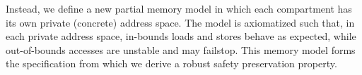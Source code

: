 \documentclass{article}
\begin{document}
Instead, we define a new partial memory model in which each compartment has its own private
(concrete) address space. The model is axiomatized such that, in each private address space,
in-bounds loads and stores behave as expected, while out-of-bounds accesses are unstable and
may failstop. This memory model forms the specification from which we derive a robust
safety preservation property.








\end{document}
